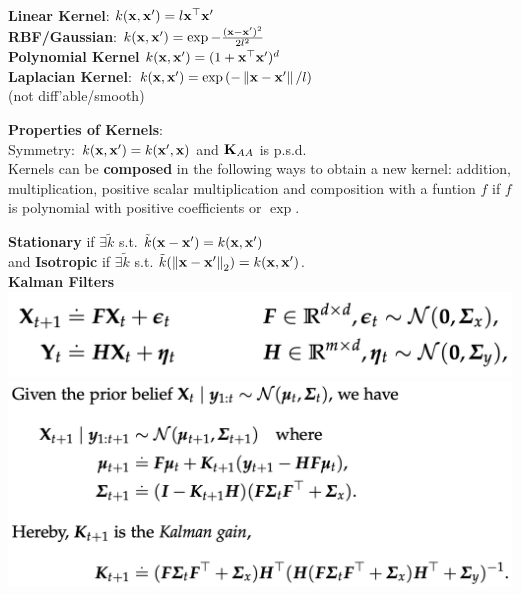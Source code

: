 \begin{framed}
    \textbf{Linear Kernel}: $k(\mathbf{x}, \mathbf{x'}) = l \mathbf{x}^\top \mathbf{x'}$ \\
    \textbf{RBF/Gaussian}: $k(\mathbf{x}, \mathbf{x'}) = \exp{-\frac{(\mathbf{x}- \mathbf{x'})^2}{2 l^2}}$ \\
    \textbf{Polynomial Kernel} $k(\mathbf{x}, \mathbf{x'}) = (1 + \mathbf{x}^\top \mathbf{x'})^d$ \\
    \textbf{Laplacian Kernel}: $k(\vx, \vxp) = \exp{\left(- \norm{\vx - \vxp}/l\right)}$ \\
    (not diff'able/smooth)
\end{framed}
\begin{framed}
    \textbf{Properties of Kernels}:  \\
    Symmetry: $k(\mathbf{x}, \mathbf{x'}) = k(\mathbf{x'}, \mathbf{x})$ and $\mathbf{K}_{AA}$ is p.s.d. \\
    Kernels can be \textbf{composed} in the following ways to obtain a new kernel: addition, multiplication, positive scalar multiplication and composition with a funtion $f$ if $f$ is polynomial with positive coefficients or $\exp$.
\end{framed}
\textbf{Stationary} if $\exists\tilde{k}$ s.t. $\tilde{k}(\mathbf{x} - \mathbf{x'}) = k(\mathbf{x}, \mathbf{x'})$ \\
and \textbf{Isotropic} if $\exists\tilde{k}$ s.t. $\tilde{k}(\norm{\vx-\vxp}_2) = k(\vx, \vxp)$. \\ 
\textbf{Kalman Filters} \\
\includegraphics[width=0.8\linewidth]{images/kalman 1.png}
\includegraphics[width=\linewidth]{images/kalman 2.png}
